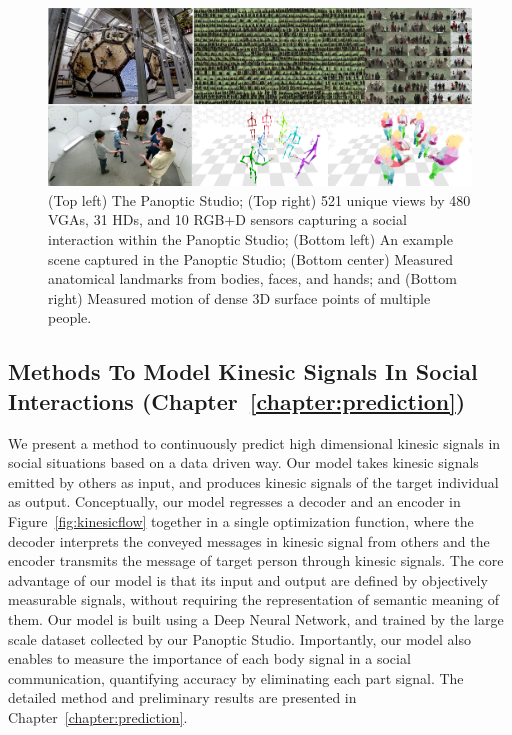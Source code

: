 

\begin{figure}[t]
	\centering
	\includegraphics[width=\textwidth]{figures/teaser_full}
	\caption{(Top left) The Panoptic Studio; (Top right) 521 unique views by 480 VGAs, 31 HDs, and 10 RGB+D sensors capturing a social interaction within the Panoptic Studio; (Bottom left) An example scene captured in the Panoptic Studio; (Bottom center) Measured anatomical landmarks from bodies, faces, and hands; and (Bottom right) Measured motion of dense 3D surface points of multiple people.}	
	\label{fig:teaser}
\end{figure}


\subsection{Methods To Model Kinesic Signals In Social Interactions (Chapter~\ref{chapter:prediction})  }

We present a method to continuously predict high dimensional kinesic signals in social situations based on a data driven way. Our model takes kinesic signals emitted by others as input, and produces kinesic signals of the target individual as output. Conceptually, our model regresses a decoder and an encoder in Figure~\ref{fig:kinesicflow} together in a single optimization function, where the decoder interprets the conveyed messages in kinesic signal from others and the encoder transmits the message of target person through kinesic signals. The core advantage of our model is that its input and output are defined by objectively measurable signals, without requiring the representation of semantic meaning of them. Our model is built using a Deep Neural Network, and trained by the large scale dataset collected by our Panoptic Studio. Importantly, our model also enables to measure the importance of each body signal in a social communication, quantifying accuracy by eliminating each part signal. The detailed method and preliminary results are presented in Chapter~\ref{chapter:prediction}.

